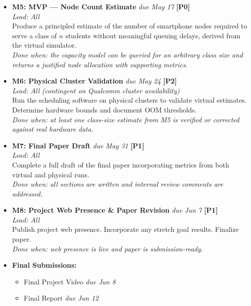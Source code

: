 \documentclass{article}
\begin{document}
{\begin{itemize}[leftmargin=0pt, itemindent=0pt, labelsep=0pt, label={}]
\item \textbf{M5: MVP --- Node Count Estimate} \hfill \textit{due May 17} \textbf{[P0]}\\
\textit{Lead: All} \\
Produce a principled estimate of the number of smartphone nodes required to serve a class of $n$ students without meaningful queuing delays, derived from the virtual simulator.\\
\textit{Done when: the capacity model can be queried for an arbitrary class size and returns a justified node allocation with supporting metrics.}

\item \textbf{M6: Physical Cluster Validation} \hfill \textit{due May 24} \textbf{[P2]}\\
\textit{Lead: All (contingent on Qualcomm cluster availability)} \\
Run the scheduling software on physical clusters to validate virtual estimates. Determine hardware bounds and document OOM thresholds.\\
\textit{Done when: at least one class-size estimate from M5 is verified or corrected against real hardware data.}

\item \textbf{M7: Final Paper Draft} \hfill \textit{due May 31} \textbf{[P1]}\\
\textit{Lead: All} \\
Complete a full draft of the final paper incorporating metrics from both virtual and physical runs.\\
\textit{Done when: all sections are written and internal review comments are addressed.}

\item \textbf{M8: Project Web Presence \& Paper Revision} \hfill \textit{due Jun 7} \textbf{[P1]}\\
\textit{Lead: All} \\
Publish project web presence. Incorporate any stretch goal results. Finalize paper.\\
\textit{Done when: web presence is live and paper is submission-ready.}

\item \textbf{Final Submissions:}
    \begin{itemize}
        \item Final Project Video \hfill \textit{due Jun 8}
        \item Final Report \hfill \textit{due Jun 12}
    \end{itemize}
\end{itemize}
}
\end{document}
